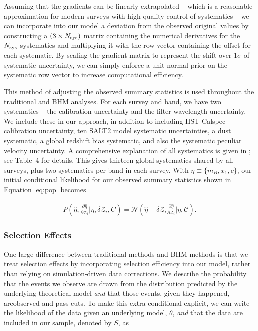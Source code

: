 \documentclass[a4paper,fleqn,usenatbib]{mnras}
\newcommand{\green}{\color{forestgreen}}
\newcommand{\cov}{\mathcal{C}}
\newcommand{\Z}{\mathcal{Z}}
\begin{document}
Assuming that the gradients can be linearly extrapolated -- which is a reasonable approximation for modern surveys with high quality control of systematics -- we can incorporate into our model a deviation from the observed original values by constructing a $(3 \times N_{\rm sys})$ matrix containing the numerical derivatives for the $N_{\rm sys}$ systematics and multiplying it with the row vector containing the offset for each systematic. By scaling the gradient matrix to represent the shift over $1\sigma$ of systematic uncertainty, we can simply enforce a unit normal prior on the systematic row vector to increase computational efficiency.

This method of adjusting the observed summary statistics is used throughout the traditional and BHM analyses. For each survey and band, we have two systematics --  the calibration uncertainty and the filter wavelength uncertainty. We include these in our approach, in addition to including HST Calspec calibration uncertainty, ten SALT2 model systematic uncertainties, a dust systematic, a global redshift bias systematic, and also the systematic peculiar velocity uncertainty. {\green A comprehensive explanation of all systematics is given in \citet{Brout18SYS}; see Table~4 for details.} This gives thirteen global systematics shared by all surveys, plus two systematics per band in each survey. With $\eta \equiv \lbrace m_B, x_1, c \rbrace$, our initial conditional likelihood for our observed summary statistics shown in Equation \eqref{eq:pop} becomes

\begin{align}
P\left(\hat{\eta}, \frac{\partial \hat{\eta}}{\partial \Z_i} | \eta, \delta \Z_i, C\right) = \mathcal{N}\left(\hat{\eta} + \delta \Z_i \frac{\partial \hat{\eta}}{\partial \Z_i}|\eta,\cov\right). \label{eq:l3}
\end{align}



\subsubsection{Selection Effects}
\label{sec:selection}



One large difference between traditional methods and BHM methods is that we treat selection effects by incorporating selection efficiency into our model, rather than relying on simulation-driven data corrections. We describe the probability that the events we observe are drawn from the distribution predicted by the underlying theoretical model \textit{and} that those events, given they happened, are{\green observed and pass cuts}.  To make this extra conditional explicit, we can write the likelihood of the data given an underlying model, $\theta$, \textit{and} that the data are included in our sample, denoted by $S$, as
\end{document}
